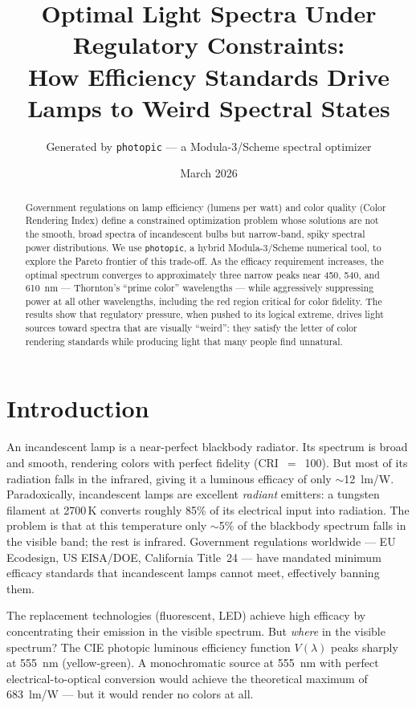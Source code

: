 \documentclass[11pt]{article}
\title{Optimal Light Spectra Under Regulatory Constraints:\\
       How Efficiency Standards Drive Lamps to Weird Spectral States}
\author{Generated by \texttt{photopic} --- a Modula-3/Scheme spectral optimizer}
\date{March 2026}
\begin{document}
\maketitle

\begin{abstract}
Government regulations on lamp efficiency (lumens per watt) and color quality
(Color Rendering Index) define a constrained optimization problem whose
solutions are not the smooth, broad spectra of incandescent bulbs but
narrow-band, spiky spectral power distributions.  We use \texttt{photopic},
a hybrid Modula-3/Scheme numerical tool, to explore the Pareto frontier of
this trade-off.  As the efficacy requirement increases, the optimal spectrum
converges to approximately three narrow peaks near 450, 540, and 610~nm ---
Thornton's ``prime color'' wavelengths --- while aggressively suppressing
power at all other wavelengths, including the red region critical for color
fidelity.  The results show that regulatory pressure, when pushed to its
logical extreme, drives light sources toward spectra that are visually
``weird'': they satisfy the letter of color rendering standards while
producing light that many people find unnatural.
\end{abstract}

\section{Introduction}

An incandescent lamp is a near-perfect blackbody radiator.  Its spectrum is
broad and smooth, rendering colors with perfect fidelity (CRI~$=$~100).
But most of its radiation falls in the infrared, giving it a luminous efficacy
of only $\sim$12~lm/W.  Paradoxically, incandescent lamps are excellent
\emph{radiant} emitters: a tungsten filament at 2700\,K converts roughly
85\% of its electrical input into radiation.  The problem is that at this
temperature only $\sim$5\% of the blackbody spectrum falls in the visible
band; the rest is infrared.  Government regulations worldwide --- EU
Ecodesign, US EISA/DOE, California Title~24 --- have mandated minimum
efficacy standards that incandescent lamps cannot meet, effectively banning
them.

The replacement technologies (fluorescent, LED) achieve high efficacy by
concentrating their emission in the visible spectrum.  But \emph{where} in
the visible spectrum?  The CIE photopic luminous efficiency function $V(\lambda)$
peaks sharply at 555~nm (yellow-green).  A monochromatic source at 555~nm
with perfect electrical-to-optical conversion would achieve the theoretical
maximum of 683~lm/W --- but it would render no colors at all.
\end{document}
